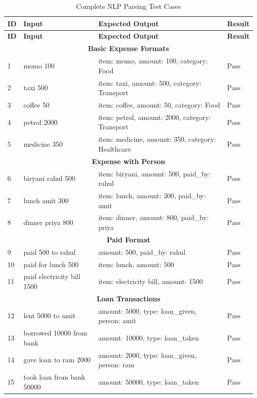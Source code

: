 \begin{longtable}{|p{0.5cm}|p{4cm}|p{4cm}|p{4cm}|}
\caption{Complete NLP Parsing Test Cases} \label{tab:nlp-tests-complete} \\
\hline
\textbf{ID} & \textbf{Input} & \textbf{Expected Output} & \textbf{Result} \\
\hline
\endfirsthead
\hline
\textbf{ID} & \textbf{Input} & \textbf{Expected Output} & \textbf{Result} \\
\hline
\endhead

\multicolumn{4}{c}{\textbf{Basic Expense Formats}} \\
\hline
1 & momo 100 & item: momo, amount: 100, category: Food & Pass \\
\hline
2 & taxi 500 & item: taxi, amount: 500, category: Transport & Pass \\
\hline
3 & coffee 50 & item: coffee, amount: 50, category: Food & Pass \\
\hline
4 & petrol 2000 & item: petrol, amount: 2000, category: Transport & Pass \\
\hline
5 & medicine 350 & item: medicine, amount: 350, category: Healthcare & Pass \\
\hline

\multicolumn{4}{c}{\textbf{Expense with Person}} \\
\hline
6 & biryani rahul 500 & item: biryani, amount: 500, paid\_by: rahul & Pass \\
\hline
7 & lunch amit 300 & item: lunch, amount: 300, paid\_by: amit & Pass \\
\hline
8 & dinner priya 800 & item: dinner, amount: 800, paid\_by: priya & Pass \\
\hline

\multicolumn{4}{c}{\textbf{Paid Format}} \\
\hline
9 & paid 500 to rahul & amount: 500, paid\_by: rahul & Pass \\
\hline
10 & paid for lunch 500 & item: lunch, amount: 500 & Pass \\
\hline
11 & paid electricity bill 1500 & item: electricity bill, amount: 1500 & Pass \\
\hline

\multicolumn{4}{c}{\textbf{Loan Transactions}} \\
\hline
12 & lent 5000 to amit & amount: 5000, type: loan\_given, person: amit & Pass \\
\hline
13 & borrowed 10000 from bank & amount: 10000, type: loan\_taken & Pass \\
\hline
14 & gave loan to ram 2000 & amount: 2000, type: loan\_given, person: ram & Pass \\
\hline
15 & took loan from bank 50000 & amount: 50000, type: loan\_taken & Pass \\
\hline


\end{longtable}
